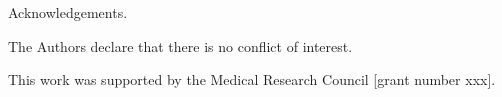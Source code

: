 \documentclass[sagev]{sagej}
\begin{document}
\begin{acks}
Acknowledgements.
\end{acks}

\begin{dci}
The Authors declare that there is no conflict of interest.
\end{dci}

\begin{funding}
This work was supported by the Medical Research Council [grant number xxx].
\end{funding}



\end{document}
